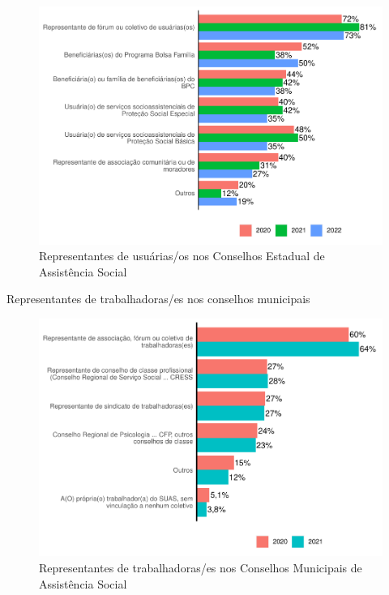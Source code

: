 \documentclass[
  brazilian]{report}
\begin{document}
\begin{figure}
\includegraphics{Censo-SUAS-2022_files/figure-latex/usu_ceas-1} \caption[Representantes de usuárias/os nos Conselhos Estadual de Assistência Social]{Representantes de usuárias/os nos Conselhos Estadual de Assistência Social}\label{fig:usu_ceas}
\end{figure}

Representantes de trabalhadoras/es nos conselhos municipais

\begin{figure}
\includegraphics{Censo-SUAS-2022_files/figure-latex/trab_cmun-1} \caption[Representantes de trabalhadoras/es nos Conselhos Municipais de Assistência Social]{Representantes de trabalhadoras/es nos Conselhos Municipais de Assistência Social}\label{fig:trab_cmun}
\end{figure}
\end{document}
